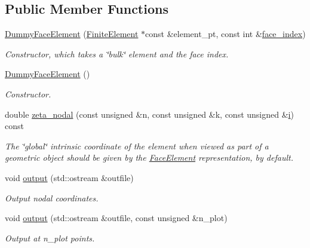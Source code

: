 \subsection*{Public Member Functions}
\begin{DoxyCompactItemize}
\item 
\hyperlink{classoomph_1_1DummyFaceElement_adb775a8739801cf66da2e12b1a04d4d2}{Dummy\+Face\+Element} (\hyperlink{classoomph_1_1FiniteElement}{Finite\+Element} $\ast$const \&element\+\_\+pt, const int \&\hyperlink{classoomph_1_1FaceElement_a478d577ac6db67ecc80f1f02ae3ab170}{face\+\_\+index})
\begin{DoxyCompactList}\small\item\em Constructor, which takes a \char`\"{}bulk\char`\"{} element and the face index. \end{DoxyCompactList}\item 
\hyperlink{classoomph_1_1DummyFaceElement_a176777e1996a968a9895e07dda2fb968}{Dummy\+Face\+Element} ()
\begin{DoxyCompactList}\small\item\em Constructor. \end{DoxyCompactList}\item 
double \hyperlink{classoomph_1_1DummyFaceElement_a2ee49bd3158d30c0c84c63dbd25e7196}{zeta\+\_\+nodal} (const unsigned \&n, const unsigned \&k, const unsigned \&\hyperlink{cfortran_8h_adb50e893b86b3e55e751a42eab3cba82}{i}) const
\begin{DoxyCompactList}\small\item\em The \char`\"{}global\char`\"{} intrinsic coordinate of the element when viewed as part of a geometric object should be given by the \hyperlink{classoomph_1_1FaceElement}{Face\+Element} representation, by default. \end{DoxyCompactList}\item 
void \hyperlink{classoomph_1_1DummyFaceElement_a18c02152a69fd63b391a51aaae0279f2}{output} (std\+::ostream \&outfile)
\begin{DoxyCompactList}\small\item\em Output nodal coordinates. \end{DoxyCompactList}\item 
void \hyperlink{classoomph_1_1DummyFaceElement_a65af668caa98997d5ef1227e4f2bf733}{output} (std\+::ostream \&outfile, const unsigned \&n\+\_\+plot)
\begin{DoxyCompactList}\small\item\em Output at n\+\_\+plot points. \end{DoxyCompactList}\item 

\end{DoxyCompactItemize}
